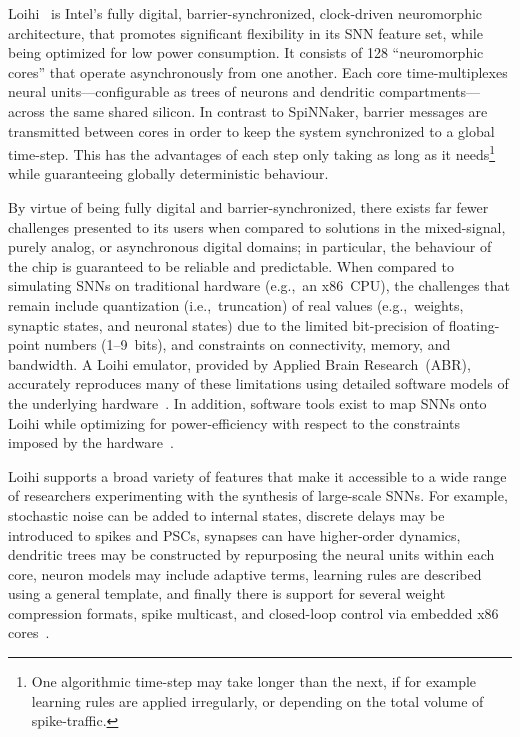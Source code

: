 Loihi~\citep{davies2018loihi} is Intel's fully digital, barrier-synchronized, clock-driven neuromorphic architecture, that promotes significant flexibility in its SNN feature set, while being optimized for low power consumption.
It consists of 128 ``neuromorphic cores'' that operate asynchronously from one another.
Each core time-multiplexes  neural units---configurable as trees of neurons and dendritic compartments---across the same shared silicon.
In contrast to SpiNNaker, barrier messages are transmitted between cores in order to keep the system synchronized to a global time-step.
This has the advantages of each step only taking as long as it needs\footnote{
One algorithmic time-step may take longer than the next, if for example learning rules are applied irregularly, or depending on the total volume of spike-traffic.} 
while guaranteeing globally deterministic behaviour.

By virtue of being fully digital and barrier-synchronized, there exists far fewer challenges presented to its users when compared to solutions in the mixed-signal, purely analog, or asynchronous digital domains; in particular, the behaviour of the chip is guaranteed to be reliable and predictable.
When compared to simulating SNNs on traditional hardware (e.g.,~an x86~CPU), the challenges that remain include quantization (i.e.,~truncation) of real values (e.g.,~weights, synaptic states, and neuronal states) due to the limited bit-precision of floating-point numbers (1--9~bits), and constraints on connectivity, memory, and bandwidth.
A Loihi emulator, provided by Applied Brain Research~(ABR), accurately reproduces many of these limitations using detailed software models of the underlying hardware~\citep{blouw2018a}.
In addition, software tools exist to map SNNs onto Loihi while optimizing for power-efficiency with respect to the constraints imposed by the hardware~\citep{lin2018programming, lin2018mapping}.

Loihi supports a broad variety of features that make it accessible to a wide range of researchers experimenting with the synthesis of large-scale SNNs.
For example, stochastic noise can be added to internal states, discrete delays may be introduced to spikes and PSCs, synapses can have higher-order dynamics, dendritic trees may be constructed by repurposing the neural units within each core, neuron models may include adaptive terms, learning rules are described using a general template, and finally there is support for several weight compression formats, spike multicast, and closed-loop control via embedded x86 cores~\citep{davies2018loihi}.

